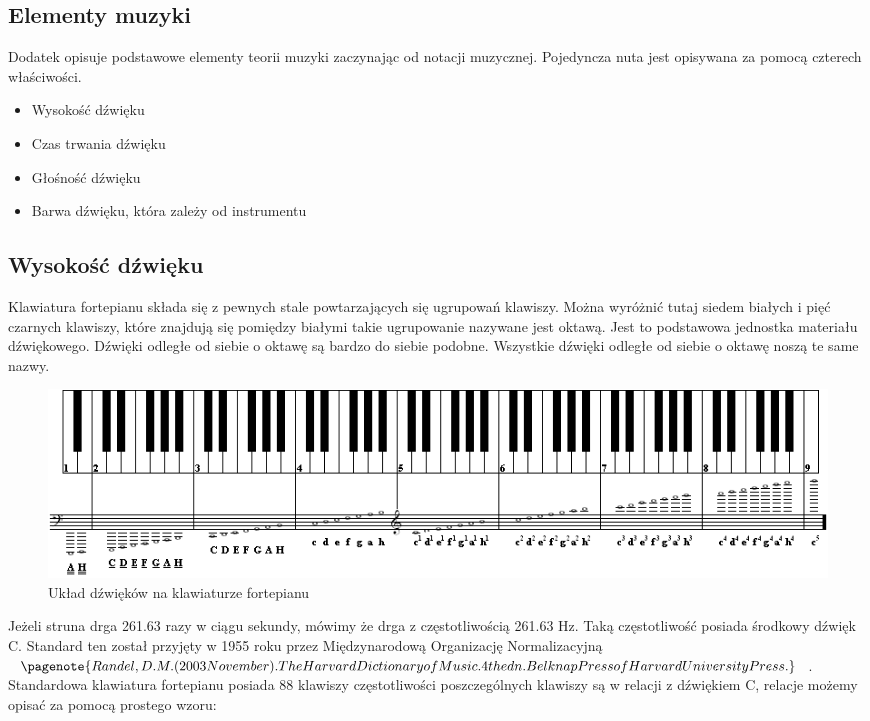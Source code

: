 \documentclass[]{book}
\theoremstyle{definition}
\begin{document}
\begin{appendices}
	\chapter{Elementy muzyki}
	Dodatek opisuje podstawowe elementy teorii muzyki zaczynając od notacji muzycznej. Pojedyncza nuta jest opisywana za pomocą czterech właściwości.
	\begin{itemize}
		\item Wysokość dźwięku 
		\item Czas trwania dźwięku
		\item Głośność dźwięku
		\item Barwa dźwięku, która zależy od instrumentu
	\end{itemize}

	\section{Wysokość dźwięku}
	Klawiatura fortepianu składa się z pewnych stale powtarzających się ugrupowań klawiszy. Można wyróżnić tutaj siedem białych i pięć czarnych klawiszy, które znajdują się pomiędzy białymi takie ugrupowanie nazywane jest oktawą. Jest to podstawowa jednostka materiału dźwiękowego. Dźwięki odległe od siebie o oktawę są bardzo do siebie podobne. Wszystkie dźwięki odległe od siebie o oktawę noszą te same nazwy. 
	
	\begin{figure}[H]
		\centering
		\includegraphics[width=0.7\linewidth]{Scales_and_keyboard}
		\caption{Układ dźwięków na klawiaturze fortepianu }
		\label{fig:scalesandkeyboard}
	\end{figure}
	
	
	
	Jeżeli struna drga 261.63 razy w ciągu sekundy, mówimy że drga z częstotliwością 261.63 Hz. Taką częstotliwość posiada środkowy dźwięk C. Standard ten został przyjęty w 1955 roku przez Międzynarodową Organizację Normalizacyjną$\pagenote{Randel, D.M. (2003 November). The Harvard Dictionary of Music. 4th edn. Belknap
		Press of Harvard University Press.}$. Standardowa klawiatura fortepianu posiada 88 klawiszy częstotliwości poszczególnych klawiszy są w relacji z dźwiękiem C, relacje możemy opisać za pomocą prostego wzoru:
	

\end{appendices}
\end{document}
